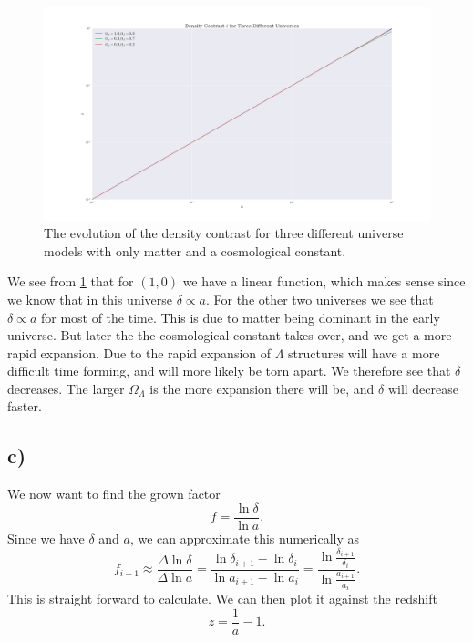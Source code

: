 \documentclass[a4paper,norsk, 10pt]{article}
\begin{document}
\begin{figure}[!h]
\centering
\includegraphics[scale=0.25]{a_v_delta}
\caption{The evolution of the density contrast for three different universe models with only matter and a cosmological constant.}\label{fig:a_v_delta}
\end{figure}


We see from \ref{fig:a_v_delta} that for $(1,0)$ we have a linear function, which makes sense since we know that in this universe $\delta \propto a$. For the other two universes we see that $\delta \propto a$ for most of the time. This is due to matter being dominant in the early universe. But later the the cosmological constant takes over, and we get a more rapid expansion. Due to the rapid expansion of $\Lambda$ structures will have a more difficult time forming, and will more likely be torn apart. We therefore see that $\delta$ decreases. The larger $\Omega_{\Lambda}$ is the more expansion there will be, and $\delta$ will decrease faster.

\subsection{c)}
We now want to find the grown factor 
\begin{equation}\label{eq:f}
f = \frac{\ln \delta}{\ln a}.
\end{equation}
Since we have $\delta$ and $a$, we can approximate this numerically as
\begin{equation}
f_{i+1} \approx \frac{\Delta \ln \delta}{\Delta \ln a} = \frac{\ln \delta_{i+1} - \ln \delta_{i}}{\ln a_{i+1} - \ln a_{i}} = \frac{\ln \frac{\delta_{i+1}}{\delta_{i}}}{\ln \frac{a_{i+1}}{a_{i}}}.
\end{equation}
This is straight forward to calculate. We can then plot it against the redshift
\begin{equation}
z = \frac{1}{a} - 1.
\end{equation}
\end{document}
